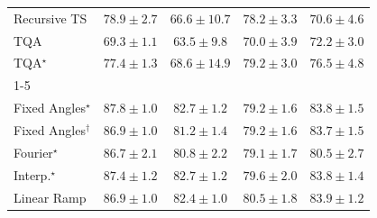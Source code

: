\begin{tabular}{l|cccc|}
Recursive TS & {\cellcolor[HTML]{CE4F03}} \color[HTML]{F1F1F1} $78.9\pm 2.7$ & {\cellcolor[HTML]{FEBD49}} \color[HTML]{000000} $66.6\pm 10.7$ & {\cellcolor[HTML]{D35406}} \color[HTML]{F1F1F1} $78.2\pm 3.3$ & {\cellcolor[HTML]{FD9627}} \color[HTML]{000000} $70.6\pm 4.6$ \\
TQA & {\cellcolor[HTML]{FEA332}} \color[HTML]{000000} $69.3\pm 1.1$ & {\cellcolor[HTML]{FED471}} \color[HTML]{000000} $63.5\pm 9.8$ & {\cellcolor[HTML]{FE9C2C}} \color[HTML]{000000} $70.0\pm 3.9$ & {\cellcolor[HTML]{F68820}} \color[HTML]{F1F1F1} $72.2\pm 3.0$ \\
TQA$^\star$ & {\cellcolor[HTML]{D85A09}} \color[HTML]{F1F1F1} $77.4\pm 1.3$ & {\cellcolor[HTML]{FEAA38}} \color[HTML]{000000} $68.6\pm 14.9$ & {\cellcolor[HTML]{CB4B02}} \color[HTML]{F1F1F1} $79.2\pm 3.0$ & {\cellcolor[HTML]{DF620D}} \color[HTML]{F1F1F1} $76.5\pm 4.8$ \\
\cline{1-5}
\multicolumn{5}{c}{\rule{0pt}{8pt}PP} \\
\midrule
Fixed Angles$^\star$ & {\cellcolor[HTML]{00472A}} \color[HTML]{F1F1F1} $87.8\pm 1.0$ & {\cellcolor[HTML]{076D39}} \color[HTML]{F1F1F1} $82.7\pm 1.2$ & {\cellcolor[HTML]{228343}} \color[HTML]{F1F1F1} $79.2\pm 1.6$ & {\cellcolor[HTML]{006636}} \color[HTML]{F1F1F1} $83.8\pm 1.5$ \\
Fixed Angles$^\dagger$ & {\cellcolor[HTML]{004E2D}} \color[HTML]{F1F1F1} $86.9\pm 1.0$ & {\cellcolor[HTML]{13773D}} \color[HTML]{F1F1F1} $81.2\pm 1.4$ & {\cellcolor[HTML]{228343}} \color[HTML]{F1F1F1} $79.2\pm 1.6$ & {\cellcolor[HTML]{006737}} \color[HTML]{F1F1F1} $83.7\pm 1.5$ \\
Fourier$^\star$ & {\cellcolor[HTML]{00502D}} \color[HTML]{F1F1F1} $86.7\pm 2.1$ & {\cellcolor[HTML]{167A3F}} \color[HTML]{F1F1F1} $80.8\pm 2.2$ & {\cellcolor[HTML]{238443}} \color[HTML]{F1F1F1} $79.1\pm 1.7$ & {\cellcolor[HTML]{187B3F}} \color[HTML]{F1F1F1} $80.5\pm 2.7$ \\
Interp.$^\star$ & {\cellcolor[HTML]{004A2B}} \color[HTML]{F1F1F1} $87.4\pm 1.2$ & {\cellcolor[HTML]{076D39}} \color[HTML]{F1F1F1} $82.7\pm 1.2$ & {\cellcolor[HTML]{208242}} \color[HTML]{F1F1F1} $79.6\pm 2.0$ & {\cellcolor[HTML]{006636}} \color[HTML]{F1F1F1} $83.8\pm 1.4$ \\
Linear Ramp & {\cellcolor[HTML]{004E2D}} \color[HTML]{F1F1F1} $86.9\pm 1.0$ & {\cellcolor[HTML]{096F3A}} \color[HTML]{F1F1F1} $82.4\pm 1.0$ & {\cellcolor[HTML]{187B3F}} \color[HTML]{F1F1F1} $80.5\pm 1.8$ & {\cellcolor[HTML]{006636}} \color[HTML]{F1F1F1} $83.9\pm 1.2$ \\

\end{tabular}
